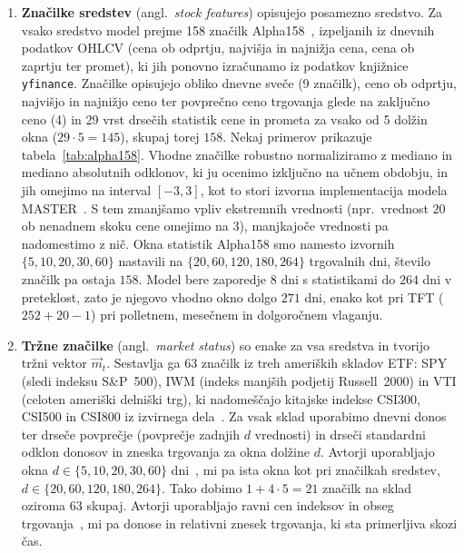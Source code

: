 \documentclass[9pt]{style/friteza}
\begin{document}
\begin{enumerate}
    \item \textbf{Značilke sredstev} (angl.\ \emph{stock features}) opisujejo posamezno sredstvo. Za vsako sredstvo model prejme 158 značilk Alpha158~\cite{yang2020qlib}, izpeljanih iz dnevnih podatkov OHLCV (cena ob odprtju, najvišja in najnižja cena, cena ob zaprtju ter promet), ki jih ponovno izračunamo iz podatkov knjižnice \texttt{yfinance}. Značilke opisujejo obliko dnevne sveče (9 značilk), ceno ob odprtju, najvišjo in najnižjo ceno ter povprečno ceno trgovanja glede na zaključno ceno (4) in 29 vrst drsečih statistik cene in prometa za vsako od 5 dolžin okna ($29\cdot 5=145$), skupaj torej $158$. Nekaj primerov prikazuje tabela~\ref{tab:alpha158}. Vhodne značilke robustno normaliziramo z mediano in mediano absolutnih odklonov, ki ju ocenimo izključno na učnem obdobju, in jih omejimo na interval $[-3,3]$, kot to stori izvorna implementacija modela MASTER~\cite{li2024master_code}. S tem zmanjšamo vpliv ekstremnih vrednosti (npr.\ vrednost $20$ ob nenadnem skoku cene omejimo na $3$), manjkajoče vrednosti pa nadomestimo z nič. Okna statistik Alpha158 smo namesto izvornih $\{5,10,20,30,60\}$ nastavili na $\{20,60,120,180,264\}$ trgovalnih dni, število značilk pa ostaja $158$. Model bere zaporedje $8$ dni s statistikami do $264$ dni v preteklost, zato je njegovo vhodno okno dolgo $271$ dni, enako kot pri TFT ($252+20-1$) pri polletnem, mesečnem in dolgoročnem vlaganju. 
    \item \textbf{Tržne značilke} (angl.\ \emph{market status}) so enake za vsa sredstva in tvorijo tržni vektor $\vec{m}_t$. Sestavlja ga 63 značilk iz treh ameriških skladov ETF: SPY (sledi indeksu S\&P~500), IWM (indeks manjših podjetij Russell~2000) in VTI (celoten ameriški delniški trg), ki nadomeščajo kitajske indekse CSI300, CSI500 in CSI800 iz izvirnega dela~\cite{li2024master}. Za vsak sklad uporabimo dnevni donos ter drseče povprečje (povprečje zadnjih $d$ vrednosti) in drseči standardni odklon donosov in zneska trgovanja za okna dolžine $d$. Avtorji uporabljajo okna $d\in\{5,10,20,30,60\}$ dni~\cite{li2024master}, mi pa ista okna kot pri značilkah sredstev, $d\in\{20,60,120,180,264\}$. Tako dobimo $1+4\cdot 5=21$ značilk na sklad oziroma 63 skupaj. Avtorji uporabljajo ravni cen indeksov in obseg trgovanja~\cite{li2024master}, mi pa donose in relativni znesek trgovanja, ki sta primerljiva skozi čas. 
\end{enumerate}
\end{document}
